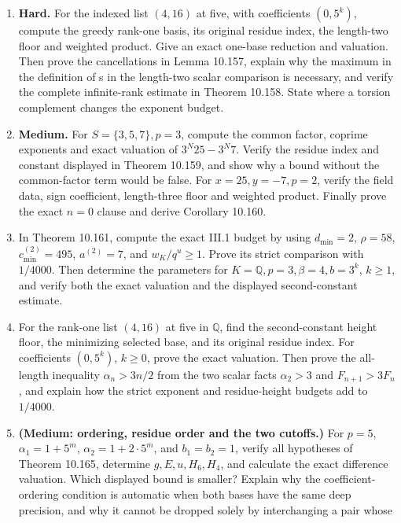 \documentclass[
  11pt,
  a4paper,
]{article}
\begin{document}
\begin{enumerate}
  both the greedy basis and its residue index; state the direct bound
  when the original list has rank zero.
\item
  \textbf{Hard.} For the indexed list \((4,16)\) at five, with
  coefficients \((0,5^k)\), compute the greedy rank-one basis, its
  original residue index, the length-two floor and weighted product.
  Give an exact one-base reduction and valuation. Then prove the
  cancellations in Lemma 10.157, explain why the maximum in the
  definition of s in the length-two scalar comparison is necessary, and
  verify the complete infinite-rank estimate in Theorem 10.158. State
  where a torsion complement changes the exponent budget.
\item
  \textbf{Medium.} For \(S=\{3,5,7\},p=3\), compute the common factor,
  coprime exponents and exact valuation of \(3^N25-3^N7\). Verify the
  residue index and constant displayed in Theorem 10.159, and show why a
  bound without the common-factor term would be false. For
  \(x=25,y=-7,p=2\), verify the field data, sign coefficient,
  length-three floor and weighted product. Finally prove the exact
  \(n=0\) clause and derive Corollary 10.160.
\item
  In Theorem 10.161, compute the exact III.1 budget by using
  \(d_{\min}=2\), \(\rho=58\), \(c_{\min}^{(2)}=495\), \(a^{(2)}=7\),
  and \(w_K/q^u\ge1\). Prove its strict comparison with \(1/4000\). Then
  determine the parameters for \(K=\mathbb Q,p=3,\beta=4,b=3^k\),
  \(k\ge1\), and verify both the exact valuation and the displayed
  second-constant estimate.
\item
  For the rank-one list \((4,16)\) at five in \(\mathbb Q\), find the
  second-constant height floor, the minimizing selected base, and its
  original residue index. For coefficients \((0,5^k)\), \(k\ge0\), prove
  the exact valuation. Then prove the all-length inequality
  \(\alpha_n>3n/2\) from the two scalar facts \(\alpha_2>3\) and
  \(F_{n+1}>3F_n\), and explain how the strict exponent and
  residue-height budgets add to \(1/4000\).
\item
  \textbf{(Medium: ordering, residue order and the two cutoffs.)} For
  \(p=5\), \(\alpha_1=1+5^m\), \(\alpha_2=1+2\cdot5^m\), and
  \(b_1=b_2=1\), verify all hypotheses of Theorem 10.165, determine
  \(g,E,u,H_6,H_4\), and calculate the exact difference valuation. Which
  displayed bound is smaller? Explain why the coefficient-ordering
  condition is automatic when both bases have the same deep precision,
  and why it cannot be dropped solely by interchanging a pair whose

\end{enumerate}
\end{document}
